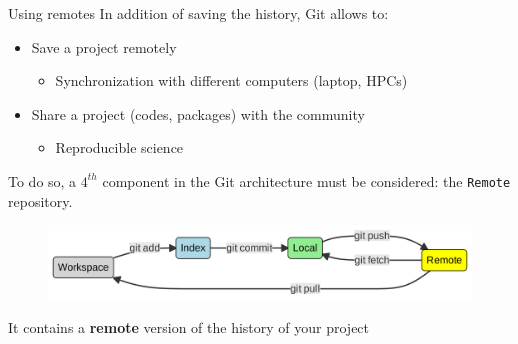 \documentclass[10pt]{beamer}
\begin{document}
\begin{frame}[fragile]{Using remotes}
\protect\hypertarget{using-remotes}{}
In addition of saving the history, Git allows
to:

\begin{itemize}
\item
  Save a project remotely

  \begin{itemize}
  \item
    Synchronization with different computers (laptop, HPCs)
  \end{itemize}
\item
  Share a project (codes, packages) with the community

  \begin{itemize}
  \item
    Reproducible science
  \end{itemize}
\end{itemize}

To do so, a \(4^{th}\) component in the Git architecture must be
considered: the \texttt{Remote} repository.


\begin{figure}[H]

{\centering \includegraphics[width=\textwidth]{mermaid/mermaid-figure-15.png}

}

\end{figure}

It contains a \textbf{remote} version of the history of
your project
\end{frame}
\end{document}
